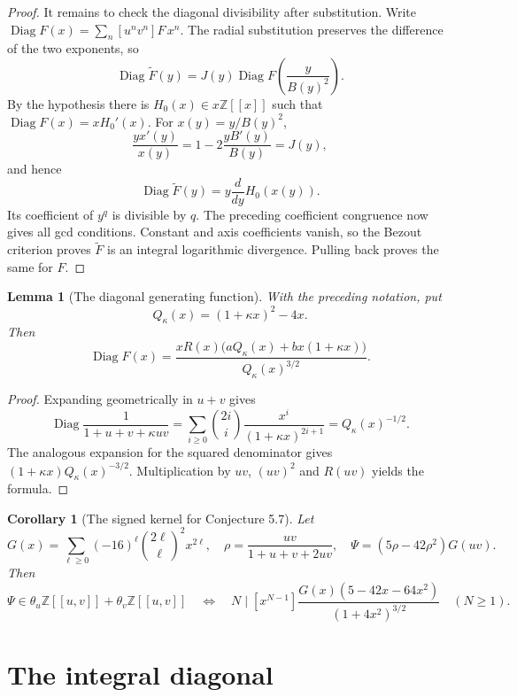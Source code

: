 \documentclass[11pt,a4paper]{article}
\numberwithin{equation}{section}
\newtheorem{lemma}[theorem]{Lemma}
\newtheorem{corollary}[theorem]{Corollary}
\theoremstyle{remark}
\begin{document}
\begin{proof}
It remains to check the diagonal divisibility after substitution.
Write $\operatorname{Diag}F(x)=\sum_n[u^nv^n]F\,x^n$.
The radial substitution preserves the difference of the two
exponents, so
\[
 \operatorname{Diag}\widetilde F(y)
 =J(y)\operatorname{Diag}F\left(\frac y{B(y)^2}\right).
\]
By the hypothesis there is $H_0(x)\in x\mathbb Z[[x]]$ such that
$\operatorname{Diag}F(x)=xH_0'(x)$. For $x(y)=y/B(y)^2$,
\[
 \frac{yx'(y)}{x(y)}=1-2\frac{yB'(y)}{B(y)}=J(y),
\]
and hence
\[
 \operatorname{Diag}\widetilde F(y)
 =y\frac d{dy}H_0(x(y)).
\]
Its coefficient of $y^q$ is divisible by $q$. The preceding
coefficient congruence now gives all gcd conditions. Constant
and axis coefficients vanish, so the Bezout criterion proves
$\widetilde F$ is an integral logarithmic divergence. Pulling
back proves the same for $F$.
\end{proof}

\begin{lemma}[The diagonal generating function]
With the preceding notation, put
\[
 Q_\kappa(x)=(1+\kappa x)^2-4x.
\]
Then
\[
 \operatorname{Diag}F(x)
 =\frac{xR(x)\bigl(aQ_\kappa(x)+bx(1+\kappa x)\bigr)}
        {Q_\kappa(x)^{3/2}}.
\]
\end{lemma}

\begin{proof}
Expanding geometrically in $u+v$ gives
\[
 \operatorname{Diag}\frac1{1+u+v+\kappa uv}
 =\sum_{i\ge0}\binom{2i}i\frac{x^i}{(1+\kappa x)^{2i+1}}
 =Q_\kappa(x)^{-1/2}.
\]
The analogous expansion for the squared denominator gives
$(1+\kappa x)Q_\kappa(x)^{-3/2}$. Multiplication by $uv$,
$(uv)^2$ and $R(uv)$ yields the formula.
\end{proof}

\begin{corollary}[The signed kernel for Conjecture 5.7]\label{cor:signed-kernel}
Let
\[
 G(x)=\sum_{\ell\ge0}(-16)^\ell\binom{2\ell}\ell^2x^{2\ell},
 \quad \rho=\frac{uv}{1+u+v+2uv},
 \quad\Psi=(5\rho-42\rho^2)G(uv).
\]
Then
\[
 \Psi\in\theta_u\mathbb Z[[u,v]]+\theta_v\mathbb Z[[u,v]]
 \quad\Longleftrightarrow\quad
 N\mid[x^{N-1}]\frac{G(x)(5-42x-64x^2)}{(1+4x^2)^{3/2}}
 \quad(N\ge1).
\]
\end{corollary}


\section{The integral diagonal}
\label{s57:arithmetic}
\end{document}
